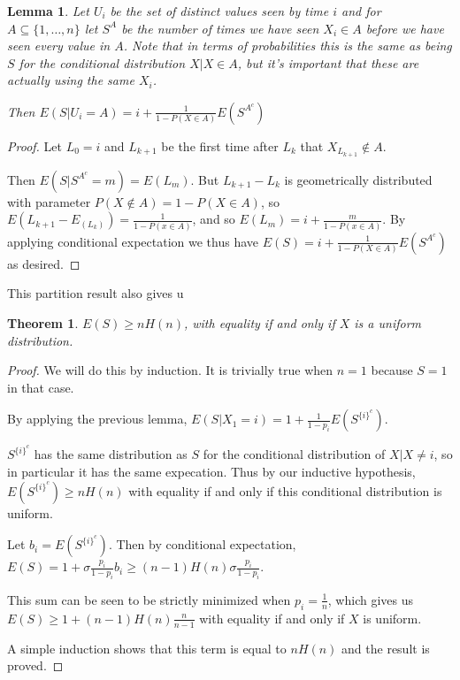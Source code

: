 \documentclass[a4paper]{book}
\newtheorem{lemma}{Lemma}
\newtheorem{theorem}{Theorem}
\begin{document}
\begin{lemma}\label{lemma:couponpartition}
Let \(U_i\) be the set of distinct values seen by time \(i\) and for \(A \subseteq \{1, \ldots, n\}\) let \(S^A\) be the number of times we have seen \(X_i \in A\) before we have seen every value in \(A\).
Note that in terms of probabilities this is the same as being \(S\) for the conditional distribution \(X | X \in A\),
but it's important that these are actually using the same \(X_i\).

Then \(E(S|U_i = A) = i + \frac{1}{1 - P(X \in A)} E(S^{A^c})\)
\end{lemma}

\begin{proof}
Let \(L_0 = i\) and \(L_{k + 1}\) be the first time after \(L_k\) that \(X_{L_{k + 1}} \not\in A\).

Then \(E(S | S^{A^c} = m) = E(L_m)\).
But \(L_{k + 1} - L_{k}\) is geometrically distributed with parameter \(P(X \not\in A) = 1 - P(X \in A)\),
so \(E(L_{k + 1} - E_(L_k)) = \frac{1}{1 - P(x \in A)}\),
and so \(E(L_m) = i + \frac{m}{1 - P(x \in A)}\).
By applying conditional expectation we thus have \(E(S) = i + \frac{1}{1 - P(X \in A)} E(S^{A^c})\) as desired.
\end{proof}

This partition result also gives u

\begin{theorem}
\(E(S) \geq n H(n)\), with equality if and only if \(X\) is a uniform distribution.
\end{theorem}

\begin{proof}
We will do this by induction.
It is trivially true when \(n = 1\) because \(S = 1\) in that case.

By applying the previous lemma,
\(E(S | X_1 = i) = 1 + \frac{1}{1 - p_i} E(S^{{\{i\}}^c})\).

\(S^{{\{i\}}^c}\) has the same distribution as \(S\) for the conditional distribution of \(X | X \neq i\),
so in particular it has the same expecation.
Thus by our inductive hypothesis,
\(E(S^{{\{i\}}^c}) \geq n H(n)\) with equality if and only if this conditional distribution is uniform.

Let \(b_i = E(S^{{\{i\}}^c})\).
Then by conditional expectation,
\(E(S) = 1 + \sigma \frac{p_i}{1 - p_i} b_i \geq (n - 1) H(n) \sigma \frac{p_i}{1 - p_i} \).

This sum can be seen to be strictly minimized when \(p_i = \frac{1}{n}\),
which gives us \(E(S) \geq 1 + (n - 1) H(n) \frac{n}{n - 1}\) with equality if and only if \(X\) is uniform.

A simple induction shows that this term is equal to \(n H(n)\) and the result is proved.
\end{proof}
\end{document}
